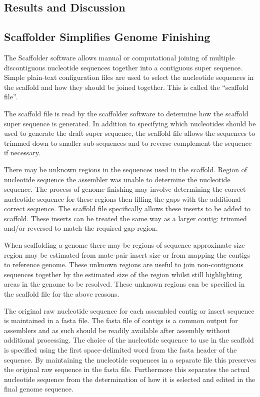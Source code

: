 \documentclass[10pt]{bmc_article}
\newenvironment{bmcformat}{\begin{raggedright}\baselineskip20pt\sloppy\setboolean{publ}{false}}{\end{raggedright}\baselineskip20pt\sloppy}
\begin{document}
\begin{bmcformat}
\section*{Results and Discussion} %

\subsection*{Scaffolder Simplifies Genome Finishing} %

The Scaffolder software allows manual or computational joining of multiple
discontiguous nucleotide sequences together into a contiguous super sequence.
Simple plain-text configuration files are used to select the nucleotide
sequences in the scaffold and how they should be joined together. This is
called the ``scaffold file''. \pb

The scaffold file is read by the scaffolder software to determine how the
scaffold super sequence is generated. In addition to specifying which
nucleotides should be used to generate the draft super sequence, the scaffold
file allows the sequences to trimmed down to smaller sub-sequences and to
reverse complement the sequence if necessary. \pb

There may be unknown regions in the sequences used in the scaffold. Region of
nucleotide sequence the assembler was unable to determine the nucleotide
sequence. The process of genome finishing may involve determining the correct
nucleotide sequence for these regions then filling the gaps with the additional
correct sequence. The scaffold file specifically allows these inserts to be
added to scaffold. These inserts can be treated the same way as a larger
contig: trimmed and/or reversed to match the required gap region. \pb

When scaffolding a genome there may be regions of sequence approximate size
region may be estimated from mate-pair insert size or from mapping the contigs
to reference genome. These unknown regions are useful to join non-contiguous
sequences together by the estimated size of the region whilst still
highlighting areas in the genome to be resolved. These unknown regions can be
specified in the scaffold file for the above reasons. \pb

The original raw nucleotide sequence for each assembled contig or insert
sequence is maintained in a fasta file. The fasta file of contigs is a common
output for assemblers and as such should be readily available after assembly
without additional processing. The choice of the nucleotide sequence to use in
the scaffold is specified using the first space-delimited word from the fasta
header of the sequence. By maintaining the nucleotide sequences in a separate
file this preserves the original raw sequence in the fasta file. Furthermore
this separates the actual nucleotide sequence from the determination of how it
is selected and edited in the final genome sequence. \pb


\end{bmcformat}
\end{document}
